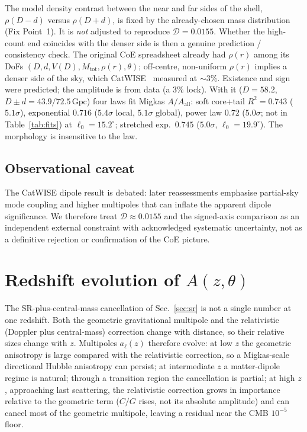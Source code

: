 \documentclass[11pt,a4paper]{article}
\begin{document}
The model density contrast between the near and far sides of the shell, \(\rho(D-d)\) versus \(\rho(D+d)\), is fixed by the already-chosen mass distribution (Fix Point~1). It is \emph{not} adjusted to reproduce \(\mathcal{D}=0.0155\). Whether the high-count end coincides with the denser side is then a genuine prediction / consistency check. The original CoE spreadsheet already had \(\rho(r)\) among its DoFs \((D,d,V(D),M_{\mathrm{tot}},\rho(r),\theta)\); off-centre, non-uniform \(\rho(r)\) implies a denser side of the sky, which CatWISE~\cite{secrest2021} measured at \(\sim3\%\). Existence and sign were predicted; the amplitude is from data (a \(3\%\) lock). With it (\(D=58.2\), \(D\pm d=43.9/72.5\,\mathrm{Gpc}\)) four laws fit Migkas \(A/A_{\mathrm{all}}\): soft core+tail \(R^2=0.743\) (\(5.1\sigma\)), exponential \(0.716\) (\(5.4\sigma\) local, \(5.1\sigma\) global), power law \(0.72\) (\(5.0\sigma\); not in Table~\ref{tab:fits}) at \(\ell_0=15.2^\circ\); stretched exp.\ \(0.745\) (\(5.0\sigma\), \(\ell_0=19.9^\circ\)). The morphology is insensitive to the law.

\subsection{Observational caveat}

The CatWISE dipole result is debated: later reassessments emphasise partial-sky mode coupling and higher multipoles that can inflate the apparent dipole significance. We therefore treat \(\mathcal{D}\approx0.0155\) and the signed-axis comparison as an independent external constraint with acknowledged systematic uncertainty, not as a definitive rejection or confirmation of the CoE picture.

\section{Redshift evolution of \(A(z,\theta)\)}
\label{sec:zcancel}

The SR-plus-central-mass cancellation of Sec.~\ref{sec:sr} is not a single number at one redshift. Both the geometric gravitational multipole and the relativistic (Doppler plus central-mass) correction change with distance, so their relative sizes change with \(z\). Multipoles \(a_\ell(z)\) therefore evolve: at low \(z\) the geometric anisotropy is large compared with the relativistic correction, so a Migkas-scale directional Hubble anisotropy can persist; at intermediate \(z\) a matter-dipole regime is natural; through a transition region the cancellation is partial; at high \(z\), approaching last scattering, the relativistic correction grows in importance relative to the geometric term (\(C/G\) rises, not its absolute amplitude) and can cancel most of the geometric multipole, leaving a residual near the CMB \(10^{-5}\) floor.
\end{document}
